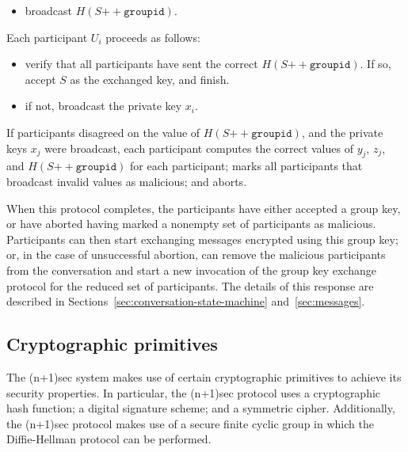 \documentclass{article}
\def\concat{\mathbin{+\!\!\!+}}
\begin{document}
\begin{description}[noitemsep]
\begin{itemize}[noitemsep,nolistsep]
	\item broadcast $H(S \concat \texttt{groupid})$.
	\end{itemize}
\item[Round 4.] Each participant $U_i$ proceeds as follows:
	\begin{itemize}[noitemsep,nolistsep]\renewcommand{\labelitemi}{--}
	\item verify that all participants have sent the correct $H(S \concat \texttt{groupid})$. If so, accept $S$ as the exchanged key, and finish.
	\item if not, broadcast the private key $x_i$.
	\end{itemize}
\item[Aftermath.] If participants disagreed on the value of $H(S \concat \texttt{groupid})$, and the private keys $x_j$ were broadcast, each participant computes the correct values of $y_j$, $z_j$, and $H(S \concat \texttt{groupid})$ for each participant; marks all participants that broadcast invalid values as malicious; and aborts.
\end{description}

When this protocol completes, the participants have either accepted a group key, or have aborted having marked a nonempty set of participants as malicious.
Participants can then start exchanging messages encrypted using this group key; or, in the case of unsuccessful abortion, can remove the malicious participants from the conversation and start a new invocation of the group key exchange protocol for the reduced set of participants.
The details of this response are described in Sections~\ref{sec:conversation-state-machine} and~\ref{sec:messages}.



\subsection{Cryptographic primitives}
\label{sec:cryptography/cryptographic-primitives}

The (n+1)sec system makes use of certain cryptographic primitives to achieve its security properties.
In particular, the (n+1)sec protocol uses a cryptographic hash function; a digital signature scheme; and a symmetric cipher.
Additionally, the (n+1)sec protocol makes use of a secure finite cyclic group in which the Diffie-Hellman protocol can be performed.
\end{document}
